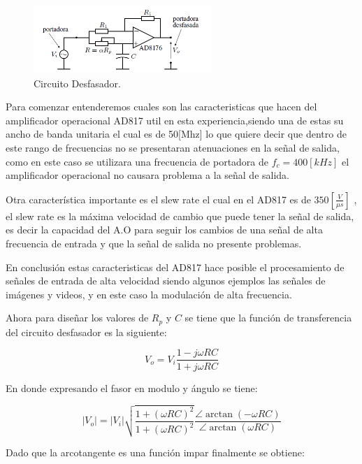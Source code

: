 \documentclass[letterpaper, titlepage]{article}
\providecommand{\abs}[1]{\lvert#1\rvert}
\begin{document}
\begin{enumerate}
\begin{figure}[H]
  \centering
    \includegraphics[width=0.6\textwidth]{circuitdesf}
  \caption{Circuito Desfasador.}
  \label{fig:ejemplo}
\end{figure}

		
Para comenzar entenderemos cuales son las caracteristicas que hacen del amplificador operacional AD817 util en esta experiencia,siendo una de estas su ancho de banda unitaria el cual es de 50[Mhz] lo que quiere decir que dentro de este rango de frecuencias no se presentaran atenuaciones en la señal de salida, como en este caso se utilizara una frecuencia de portadora de $f_{c} = 400[kHz]$ el amplificador operacional no causara problema a la señal de salida.

Otra característica importante es el slew rate el cual en el AD817 es de $350[\frac{V}{\mu s}]$ , el slew rate es la máxima velocidad de cambio que puede tener la señal de salida, es decir la capacidad del A.O para seguir los cambios de una señal de alta frecuencia de entrada y que la señal de salida no presente problemas.

En conclusión estas caracteristicas del AD817 hace posible el procesamiento de señales de entrada de alta velocidad siendo algunos ejemplos las señales de imágenes y videos, y en este caso la modulación de alta frecuencia.

Ahora para diseñar los valores de $ R_{p} $ y $C$ se tiene que la función de transferencia  del circuito desfasador es la siguiente:

\begin{equation}
V_{o} = V_{i} \frac{1- j \omega R C}{1 + j \omega R C}
\end{equation}
		
En donde expresando el fasor en modulo y ángulo se tiene:

\begin{equation*}
\abs{V_{o}}  = \abs{V_{i}} \sqrt{\frac{1 +( \omega R C)^2}{1 +( \omega R C)^2}} \frac{\angle \arctan(- \omega R C ) }{\angle \arctan(\omega R C )}
\end{equation*}

\newpage

Dado que la arcotangente es una función impar finalmente se obtiene:


\end{enumerate}
\end{document}
